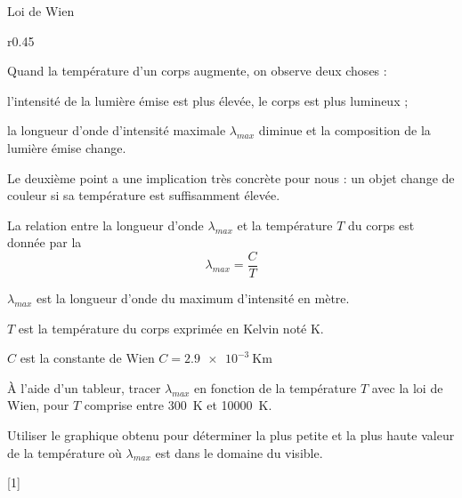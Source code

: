 \begin{doc}{Loi de Wien}
  \begin{wrapfigure}[10]{r}{0.45\linewidth}
    \vspace*{-28pt}
    \centering
  \end{wrapfigure}
  
  Quand la température d'un corps augmente, on observe deux choses :
  \begin{listeTirets}
    \item l'intensité de la lumière émise est plus élevée, le corps est plus lumineux ;
    \item la longueur d'onde d'intensité maximale $\lambda_{max}$ diminue et la composition de la lumière émise change.
  \end{listeTirets}
  Le deuxième point a une implication très concrète pour nous : un objet change de couleur si sa température est suffisamment élevée.
  \smallskip

  \begin{importants}
    La relation entre la longueur d'onde $\lambda_{max}$ et la température $T$ du corps est donnée par la 
    \begin{equation*}
      \lambda_{max} = \dfrac{C}{T}
    \end{equation*}
    \begin{listePoints}
      \item $\lambda_{max}$ est la longueur d'onde du maximum d'intensité en mètre.
      \item $T$ est la température du corps exprimée en Kelvin noté \unit{\kelvin}.
      \item $C$ est la constante de Wien $C = \qty{2,9e-3}{\kelvin\m}$
    \end{listePoints}
  \end{importants}
\end{doc}

\mesure
À l'aide d'un tableur, tracer $\lambda_{max}$ en fonction de la température $T$ avec la loi de Wien, pour $T$ comprise entre \qty{300}{\kelvin} et \qty{10000}{\kelvin}.

\mesure
Utiliser le graphique obtenu pour déterminer la plus petite et la plus haute valeur de la température où $\lambda_{max}$ est dans le domaine du visible.

[1]